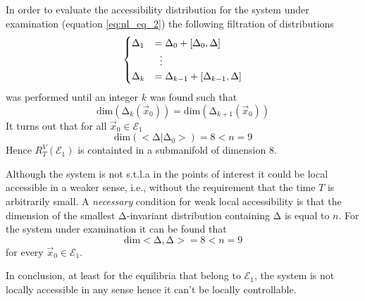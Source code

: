 In order to evaluate the accessibility distribution for the system under examination
(equation \ref{eq:nl_eq_2}) the following filtration of distributions
\[
\begin{cases}
\mathrm{\Delta}_1 &= \mathrm{\Delta}_0 + [\mathrm{\Delta}_0,\mathrm{\Delta}]\\
&\vdotswithin{=} \\
\mathrm{\Delta}_k &= \mathrm{\Delta}_{k-1} + [\mathrm{\Delta}_{k-1},\mathrm{\Delta}]
\end{cases}
\]
was performed until an integer $k$ was found such that
\[
\text{dim}(\mathrm{\Delta}_{k}(\vec{x}_0)) = \text{dim}(\mathrm{\Delta}_{k+1}(\vec{x}_0))
\]
It turns out that for all $\vec{x}_{0} \in \mathcal{E}_{1}$
\[
\mathrm{dim}(<\mathrm{\Delta}|\mathrm{\Delta}_0>) = 8 < n = 9
\]
Hence $R_{T}^{V}(\mathcal{E}_{1})$ is containted in a submanifold of dimension $8$.
\par
Although the system is not s.t.l.a in the points of interest it could be local accessible
in a weaker sense, i.e., without the requirement that the time $T$ is arbitrarily small.
A \emph{necessary} condition for weak local accessibility is that the dimension of the smallest
$\mathrm{\Delta}$-invariant distribution containing $\mathrm{\Delta}$ is equal to $n$.
For the system under examination it can be found that
\[
\mathrm{dim} <\mathrm{\Delta},\mathrm{\Delta}> = 8 < n = 9
\]
for every $\vec{x}_0 \in \mathcal{E}_1$.
\par
In conclusion, at least for the equilibria that belong to $\mathcal{E}_1$, the
system is not locally accessible in any sense hence it can't be locally controllable.

\newpage
